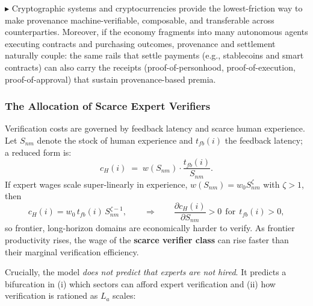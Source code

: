 \documentclass[12pt, letter]{article}
\begin{document}
$\blacktriangleright$ Cryptographic systems and cryptocurrencies provide the lowest-friction way to make provenance machine-verifiable, composable, and transferable across counterparties. Moreover, if the economy fragments into many autonomous agents executing contracts and purchasing outcomes, provenance and settlement naturally couple: the same rails that settle payments (e.g., stablecoins and smart contracts) can also carry the receipts (proof-of-personhood, proof-of-execution, proof-of-approval) that sustain provenance-based premia.


\subsubsection{The Allocation of Scarce Expert Verifiers}
Verification costs are governed by feedback latency and scarce human experience. Let $S_{nm}$ denote the stock of human experience and $t_{fb}(i)$ the feedback latency; a reduced form is:
\[
c_H(i) \;=\; w(S_{nm})\cdot\frac{t_{fb}(i)}{S_{nm}}.
\]
If expert wages scale super-linearly in experience, $w(S_{nm})=w_0S_{nm}^\zeta$ with $\zeta>1$, then
\[
c_H(i)=w_0\,t_{fb}(i)\,S_{nm}^{\zeta-1},
\qquad\Rightarrow\qquad
\frac{\partial c_H(i)}{\partial S_{nm}}>0 \ \ \text{for}\ \ t_{fb}(i)>0,
\]
so frontier, long-horizon domains are economically harder to verify. As frontier productivity rises, the wage of the \textbf{scarce verifier class} can rise faster than their marginal verification efficiency. 

Crucially, the model \emph{does not predict that experts are not hired}. It predicts a bifurcation in (i) which sectors can afford expert verification and (ii) how verification is rationed as $L_a$ scales:
\end{document}
